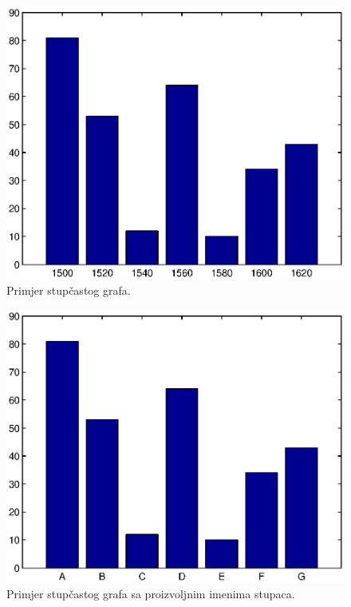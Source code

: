 \documentclass[a4paper, 10pt]{article}
\begin{document}
\begin{figure}[!htb]
\centering
\includegraphics[width=0.95\linewidth]{slike/bar_1.eps}
\caption{Primjer stupčastog grafa.}
\label{fig:bar_1}
\end{figure}

\begin{figure}[!htb]
\centering
\includegraphics[width=0.95\linewidth]{slike/bar_imenovan.eps}
\caption{Primjer stupčastog grafa sa proizvoljnim imenima stupaca.}
\label{fig:bar_imenovan}
\end{figure}

\end{document}
